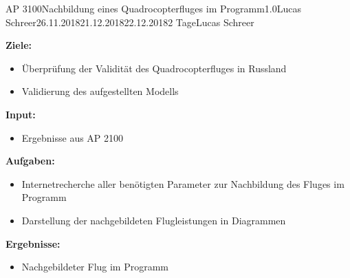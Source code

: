 \clearpage
\begin{wpd}{AP 3100}{Nachbildung eines Quadrocopterfluges im Programm}{1.0}{Lucas Schreer}{26.11.2018}{21.12.2018}{22.12.2018}{2 Tage}{Lucas Schreer}
    {
    \textbf{Ziele:}
    \begin{itemize}
        \item Überprüfung der Validität des Quadrocopterfluges in Russland
        \item Validierung des aufgestellten Modells
    \end{itemize}
    \textbf{Input:}
    \begin{itemize}
        \item Ergebnisse aus AP 2100
    \end{itemize}
    \textbf{Aufgaben:}
    \begin{itemize}
        \item Internetrecherche aller benötigten Parameter zur Nachbildung des Fluges im Programm
        \item Darstellung der nachgebildeten Flugleistungen in Diagrammen
    \end{itemize}
    \textbf{Ergebnisse:}
    \begin{itemize}
        \item Nachgebildeter Flug im Programm
    \end{itemize}
    }
\end{wpd}


